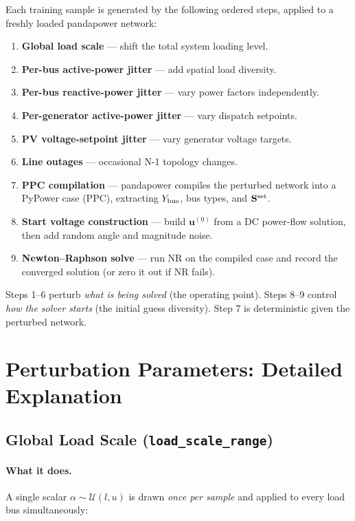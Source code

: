 \documentclass{article}
\begin{document}
Each training sample is generated by the following ordered steps, applied to
a freshly loaded pandapower network:

\begin{enumerate}[noitemsep]
  \item \textbf{Global load scale} --- shift the total system loading level.
  \item \textbf{Per-bus active-power jitter} --- add spatial load diversity.
  \item \textbf{Per-bus reactive-power jitter} --- vary power factors independently.
  \item \textbf{Per-generator active-power jitter} --- vary dispatch setpoints.
  \item \textbf{PV voltage-setpoint jitter} --- vary generator voltage targets.
  \item \textbf{Line outages} --- occasional N-1 topology changes.
  \item \textbf{PPC compilation} --- pandapower compiles the perturbed network
        into a PyPower case (PPC), extracting $Y_{\rm bus}$, bus types, and
        $\mathbf{S}^{\rm set}$.
  \item \textbf{Start voltage construction} --- build $\mathbf{u}^{(0)}$ from a
        DC power-flow solution, then add random angle and magnitude noise.
  \item \textbf{Newton--Raphson solve} --- run NR on the compiled case and record
        the converged solution (or zero it out if NR fails).
\end{enumerate}

Steps 1--6 perturb \emph{what is being solved} (the operating point).
Steps 8--9 control \emph{how the solver starts} (the initial guess diversity).
Step 7 is deterministic given the perturbed network.

\section{Perturbation Parameters: Detailed Explanation}

\subsection{Global Load Scale (\texttt{load\_scale\_range})}

\paragraph{What it does.}
A single scalar $\alpha \sim \mathcal{U}(l, u)$ is drawn \emph{once per sample}
and applied to every load bus simultaneously:
\end{document}
